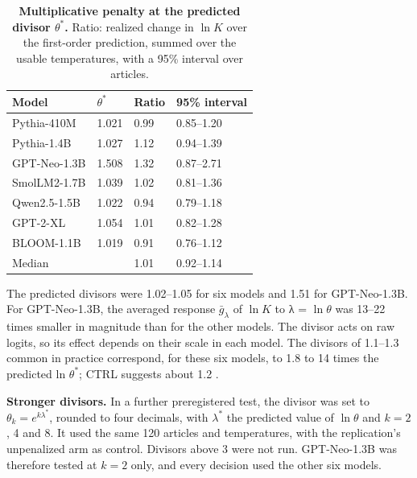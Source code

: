 \documentclass[aps,prx,onecolumn,superscriptaddress,longbibliography]{revtex4-2}
\begin{document}
\begin{table}[htbp]
\centering
\small
\setlength{\tabcolsep}{6pt}
\renewcommand{\thetable}{F6}
\caption{\textbf{Multiplicative penalty at the predicted divisor \(\theta^*\).} Ratio: realized change in \(\ln K\) over the first-order prediction, summed over the usable temperatures, with a 95\% interval over articles.}
\label{tabF6}
\begin{tabular}{@{}llll@{}}
\toprule
Model & \(\theta^*\) & Ratio & 95\% interval \\
\midrule
Pythia-410M & 1.021 & 0.99 & 0.85--1.20 \\
Pythia-1.4B & 1.027 & 1.12 & 0.94--1.39 \\
GPT-Neo-1.3B & 1.508 & 1.32 & 0.87--2.71 \\
SmolLM2-1.7B & 1.039 & 1.02 & 0.81--1.36 \\
Qwen2.5-1.5B & 1.022 & 0.94 & 0.79--1.18 \\
GPT-2-XL & 1.054 & 1.01 & 0.82--1.28 \\
BLOOM-1.1B & 1.019 & 0.91 & 0.76--1.12 \\
Median & & 1.01 & 0.92--1.14 \\
\bottomrule
\end{tabular}
\end{table}


The predicted divisors were 1.02--1.05 for six models and 1.51 for GPT-Neo-1.3B. For GPT-Neo-1.3B, the averaged response \(\bar{g}_{\lambda}\) of \(\ln K\) to λ = \(\ln \theta\) was 13--22 times smaller in magnitude than for the other models. The divisor acts on raw logits, so its effect depends on their scale in each model. The divisors of 1.1--1.3 common in practice correspond, for these six models, to 1.8 to 14 times the predicted ln \(\theta^*\); CTRL suggests about 1.2 \cite{1909.05858}.

\textbf{Stronger divisors.} In a further preregistered test, the divisor was set to \(\theta_k=e^{k\lambda^*}\), rounded to four decimals, with \(\lambda^*\) the predicted value of \(\ln \theta\) and \(k=2\), 4 and 8. It used the same 120 articles and temperatures, with the replication's unpenalized arm as control. Divisors above 3 were not run. GPT-Neo-1.3B was therefore tested at \(k=2\) only, and every decision used the other six models.
\end{document}
